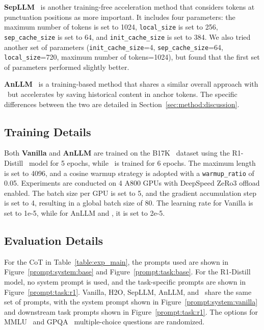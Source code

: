 \textbf{SepLLM}~\citep{arxiv24_sepllm} is another training-free acceleration method that considers tokens at punctuation positions as more important. 
It includes four parameters: the maximum number of tokens is set to 1024, \texttt{local\_size} is set to 256, \texttt{sep\_cache\_size} is set to 64, and \texttt{init\_cache\_size} is set to 384. 
We also tried another set of parameters (\texttt{init\_cache\_size}=4, \texttt{sep\_cache\_size}=64, \texttt{local\_size}=720, maximum number of tokens=1024), but found that the first set of parameters performed slightly better.

\textbf{AnLLM}~\citep{acl24_anllm} is a training-based method that shares a similar overall approach with \ours~but accelerates by saving historical content in anchor tokens. 
The specific differences between the two are detailed in Section~\ref{sec:method:discussion}.

\subsection{Training Details}
\label{sec:app:exp:training_details}
Both \textbf{Vanilla} and \textbf{AnLLM} are trained on the B17K~\citep{bespoke_stratos_train_dataset} dataset using the R1-Distill~\citep{arxiv25_deepseek_r1} model for 5 epochs, while \ours~is trained for 6 epochs. 
The maximum length is set to 4096, and a cosine warmup strategy is adopted with a \texttt{warmup\_ratio} of 0.05. 
Experiments are conducted on 4 A800 GPUs with DeepSpeed ZeRo3 offload enabled. 
The batch size per GPU is set to 5, and the gradient accumulation step is set to 4, resulting in a global batch size of 80. 
The learning rate for Vanilla is set to 1e-5, while for AnLLM and \ours, it is set to 2e-5.

\subsection{Evaluation Details}
\label{sec:app:exp:evaluation_details}
For the CoT in Table~\ref{table:exp_main}, the prompts used are shown in Figure~\ref{prompt:system:base} and Figure~\ref{prompt:task:base}. 
For the R1-Distill model, no system prompt is used, and the task-specific prompts are shown in Figure~\ref{prompt:task:r1}. 
Vanilla, H2O, SepLLM, AnLLM, and \ours~share the same set of prompts, with the system prompt shown in Figure~\ref{prompt:system:vanilla} and downstream task prompts shown in Figure~\ref{prompt:task:r1}. 
The options for MMLU~\citep{iclr21_mmlu} and GPQA~\citep{colm24_gpqa} multiple-choice questions are randomized.

